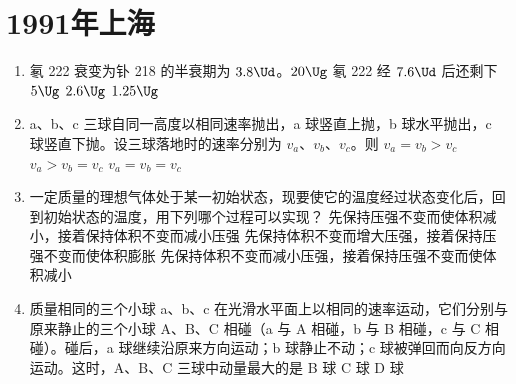 \documentclass[\gkver]{gaokaozhenti}
\begin{document}
\chapter{1991年上海}

\begin{enumerate}
\item
氡 222 衰变为钋 218 的半衰期为 $3.8\Ud$。$20\Ug$ 氡 222 经 $7.6\Ud$ 后还剩下
\fourchoices[answer=D]
{$10\Ug$}
{$5\Ug$}
{$2.6\Ug$}
{$1.25\Ug$}

\item
a、b、c 三球自同一高度以相同速率抛出，a 球竖直上抛，b 球水平抛出，c 球竖直下抛。设三球落地时的速率分别为 $v_{a}$、$v_{b}$、$v_{c}$。则
{$v_{a} = v_{b} > v_{c}$}
{$v_{a} > v_{b} = v_{c}$}
{$v_{a} = v_{b} = v_{c}$}

\item
一定质量的理想气体处于某一初始状态，现要使它的温度经过状态变化后，回到初始状态的温度，用下列哪个过程可以实现？
{先保持压强不变而使体积减小，接着保持体积不变而减小压强}
{先保持体积不变而增大压强，接着保持压强不变而使体积膨胀}
{先保持体积不变而减小压强，接着保持压强不变而使体积减小}

\item
质量相同的三个小球 a、b、c 在光滑水平面上以相同的速率运动，它们分别与原来静止的三个小球 A、B、C 相碰（a 与 A 相碰，b 与 B 相碰，c 与 C 相碰）。碰后，a 球继续沿原来方向运动；b 球静止不动；c 球被弹回而向反方向运动。这时，A、B、C 三球中动量最大的是
{B 球}
{C 球}
{D 球}


\end{enumerate}
\end{document}

